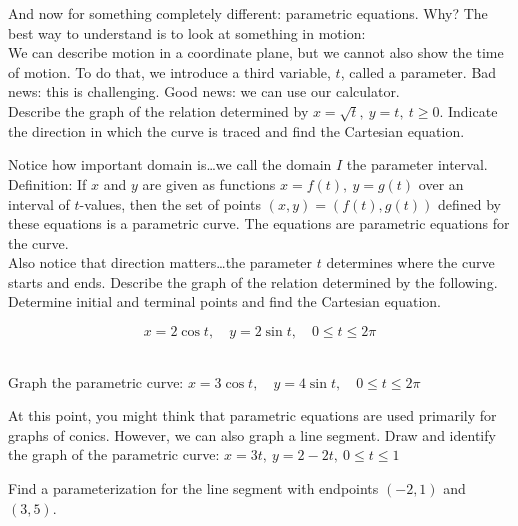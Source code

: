 \documentclass[11pt]{article}
\begin{document}
    \noindent And now for something completely different: parametric equations. Why? The best way to understand is to look at something in motion:\\[1ex]

    \noindent We can describe motion in a coordinate plane, but we cannot also show the time of motion. To do that, we introduce a third variable, $\displaystyle t$, called a parameter. Bad news: this is challenging. Good news: we can use our calculator.\\[1ex]

    \noindent Describe the graph of the relation determined by $\displaystyle x = \sqrt{t},\ y = t,\ t \ge 0$. Indicate the direction in which the curve is traced and find the Cartesian equation.

    \emptygraph

    \noindent Notice how important domain is\dots we call the domain $\displaystyle I$ the parameter interval.\\[1ex]

    \noindent Definition: If $\displaystyle x$ and $\displaystyle y$ are given as functions $\displaystyle x = f(t),\ y = g(t)$ over an interval of $\displaystyle t$-values, then the set of points $\displaystyle (x,y) = (f(t), g(t))$ defined by these equations is a parametric curve. The equations are parametric equations for the curve.\\[2ex]

    \noindent Also notice that direction matters\dots the parameter $\displaystyle t$ determines where the curve starts and ends. Describe the graph of the relation determined by the following. Determine initial and terminal points and find the Cartesian equation.

    \[x = 2\cos t,\quad y = 2\sin t,\quad 0 \le t \le 2\pi\]\\[2ex]

    \newpage

    \noindent Graph the parametric curve: $\displaystyle x = 3\cos t,\quad y = 4\sin t,\quad 0 \le t \le 2\pi$

    \emptygraph

    \vspace{2ex}

    \noindent At this point, you might think that parametric equations are used primarily for graphs of conics. However, we can also graph a line segment. Draw and identify the graph of the parametric curve: $\displaystyle x = 3t,\ y=2-2t,\ 0 \le t \le 1$

    \emptygraph

    \noindent Find a parameterization for the line segment with endpoints $\displaystyle (-2,1)$ and $\displaystyle (3,5)$.
\end{document}
